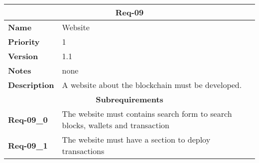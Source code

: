 \documentclass[../documentation.tex]{subfiles}
\begin{document}
\bgroup{}
\def\arraystretch{1.25}
\begin{center}
    \begin{tabular}{ |l|p{9cm}| }
        \hline
        \multicolumn{2}{|c|}{\textbf{Req-09}} \\
        \hline
        \textbf{Name} & Website \\
        \hline
        \textbf{Priority} & 1 \\
        \hline
        \textbf{Version} & 1.1 \\
        \hline
        \textbf{Notes} & none \\
        \hline
        \textbf{Description} & A website about the blockchain must be developed. \\
        \hline
        \multicolumn{2}{|c|}{\textbf{Subrequirements}} \\
        \hline
        \textbf{Req-09\_0} & The website must contains search form to search blocks, wallets and transaction \\
        \hline
        \textbf{Req-09\_1} & The website must have a section to deploy transactions \\
        \hline
    \end{tabular}
\end{center}
\egroup{}

\subsection{}
\end{document}
